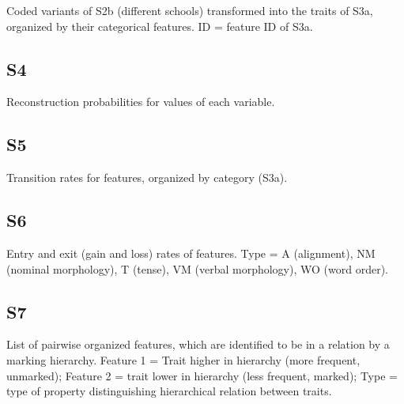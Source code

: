 \documentclass[12pt]{article}
\begin{document}
Coded variants of S2b (different schools) transformed into the traits of S3a, organized by their categorical features. ID = feature ID of S3a.



\pagebreak

\subsection*{S4}
Reconstruction probabilities for values of each variable.



\pagebreak

\subsection*{S5}
Transition rates for features, organized by category (S3a). %



\pagebreak

\subsection*{S6}
Entry and exit (gain and loss) rates of features. %
Type = A (alignment), NM (nominal morphology), T (tense), VM (verbal morphology), WO (word order).



\pagebreak

\subsection*{S7}

List of pairwise organized features, which are identified to be in a relation by a marking hierarchy. Feature 1 = Trait higher in hierarchy (more frequent, unmarked); 
Feature 2 = trait lower in hierarchy (less frequent, marked); 
Type = type of property distinguishing hierarchical relation between traits.



\break
\end{document}
